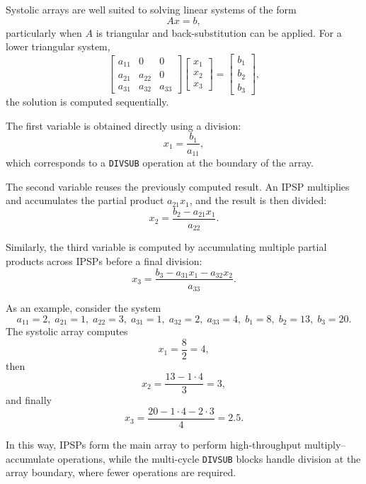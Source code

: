\documentclass[a4paper,12pt]{article}
\begin{document}
Systolic arrays are well suited to solving linear systems of the form
\begin{equation}
A x = b,
\end{equation}
particularly when $A$ is triangular and back-substitution can be applied. For a lower triangular system,
\begin{equation}
\begin{bmatrix}
a_{11} & 0 & 0 \\
a_{21} & a_{22} & 0 \\
a_{31} & a_{32} & a_{33}
\end{bmatrix}
\begin{bmatrix}
x_1 \\ x_2 \\ x_3
\end{bmatrix}
=
\begin{bmatrix}
b_1 \\ b_2 \\ b_3
\end{bmatrix},
\end{equation}
the solution is computed sequentially.

The first variable is obtained directly using a division:
\begin{equation}
x_1 = \frac{b_1}{a_{11}},
\end{equation}
which corresponds to a \texttt{DIVSUB} operation at the boundary of the array.

The second variable reuses the previously computed result. An IPSP multiplies and accumulates the partial product $a_{21}x_1$, and the result is then divided:
\begin{equation}
x_2 = \frac{b_2 - a_{21}x_1}{a_{22}}.
\end{equation}

Similarly, the third variable is computed by accumulating multiple partial products across IPSPs before a final division:
\begin{equation}
x_3 = \frac{b_3 - a_{31}x_1 - a_{32}x_2}{a_{33}}.
\end{equation}

As an example, consider the system
\[
a_{11}=2,\; a_{21}=1,\; a_{22}=3,\; a_{31}=1,\; a_{32}=2,\; a_{33}=4,\;
b_1=8,\; b_2=13,\; b_3=20.
\]
The systolic array computes
\[
x_1 = \frac{8}{2} = 4,
\]
then
\[
x_2 = \frac{13 - 1\cdot 4}{3} = 3,
\]
and finally
\[
x_3 = \frac{20 - 1\cdot 4 - 2\cdot 3}{4} = 2.5.
\]

In this way, IPSPs form the main array to perform high-throughput multiply--accumulate operations, while the multi-cycle \texttt{DIVSUB} blocks handle division at the array boundary, where fewer operations are required.
\end{document}
